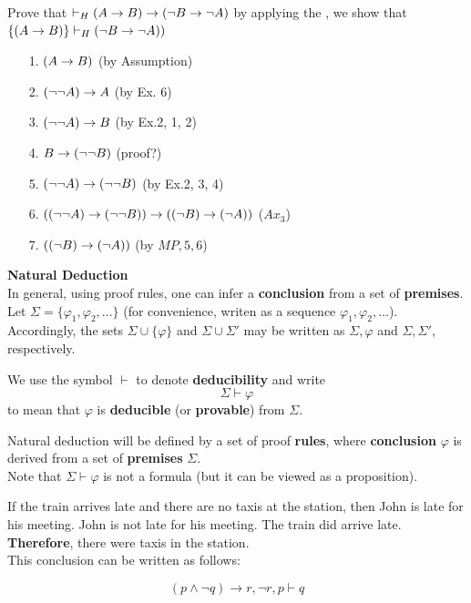 \documentclass[english, 11pt]{article}
\begin{document}
  \begin{exmp}
    Prove that $\vdash_H (A \rightarrow B) \rightarrow (\neg B \rightarrow \neg A)$ by applying the , we show that $\{(A \rightarrow B) \} \vdash_H (\neg B \rightarrow \neg A))$
    \begin{itemize}
      \item[1.] $(A \rightarrow B)$ \hfill (by Assumption)
      \item[2.] $(\neg \neg A) \rightarrow A$ \hfill (by Ex. 6)
      \item[3.] $(\neg \neg A) \rightarrow B$ \hfill (by Ex.2, 1, 2)
      \item[4.] $B \rightarrow (\neg \neg B)$ \hfill (proof?)
      \item[5.] $(\neg \neg A) \rightarrow (\neg \neg B)$ \hfill (by Ex.2, 3, 4)
      \item[6.] $((\neg \neg A) \rightarrow (\neg \neg B)) \rightarrow ((\neg B) \rightarrow (\neg A))$ \hfill ($Ax_3$)
      \item[7.] $((\neg B) \rightarrow (\neg A))$ \hfill (by $MP,5,6$)
    \end{itemize}
  \end{exmp}

  \textbf{Natural Deduction} \\

  In general, using proof rules, one can infer a \textbf{conclusion} from a set of \textbf{premises}. \\

  Let $\Sigma = \{ \varphi_1, \varphi_2, \ldots \}$ (for convenience, writen as a sequence $\varphi_1, \varphi_2, \ldots$). Accordingly, the sets $\Sigma \cup \{ \varphi \}$ and $\Sigma \cup \Sigma'$ may be written as $\Sigma, \varphi$ and $\Sigma, \Sigma'$, respectively. \\

  \begin{notation}
    We use the symbol $\vdash$ to denote \textbf{deducibility} and write
  \[ \Sigma \vdash \varphi \]
  to mean that $\varphi$ is \textbf{deducible} (or \textbf{provable}) from $\Sigma$. \\
  \end{notation}

  Natural deduction will be defined by a set of proof \textbf{rules}, where \textbf{conclusion} $\varphi$ is derived from a set of \textbf{premises} $\Sigma$. \\

  Note that $\Sigma \vdash \varphi$ is not a formula (but it can be viewed as a proposition).

  \begin{exmp}
    If the train arrives late and there are no taxis at the station, then John is late for his meeting. John is not late for his meeting. The train did arrive late. \textbf{Therefore}, there were taxis in the station. \\

    This conclusion can be written as follows:

    \[ (p \land \neg q) \rightarrow r, \neg r , p \vdash q \]
  \end{exmp}
\end{document}
